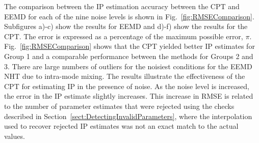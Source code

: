 \documentclass[11pt,draftcls,onecolumn]{IEEEtran}
\begin{document}
The comparison between the IP estimation accuracy between the CPT and EEMD for each of the nine noise levels is shown in Fig.~\ref{fig:RMSEComparison}. Subfigures a)-c) show the results for EEMD and d)-f) show the results for the CPT. The error is expressed as a percentage of the maximum possible error, $\pi$. Fig.~\ref{fig:RMSEComparison} shows that the CPT yielded better IP estimates for Group 1 and a comparable performance between the methods for Groups 2 and 3. There are large numbers of outliers for the noisiest conditions for the EEMD NHT due to intra-mode mixing. The results illustrate the effectiveness of the CPT for estimating IP in the presence of noise. As the noise level is increased, the error in the IP estimate slightly increases. This increase in RMSE is related to the number of parameter estimates that were rejected using the checks described in Section~\ref{sect:DetectingInvalidParameters}, where the interpolation used to recover rejected IP estimates was not an exact match to the actual values.
\end{document}

